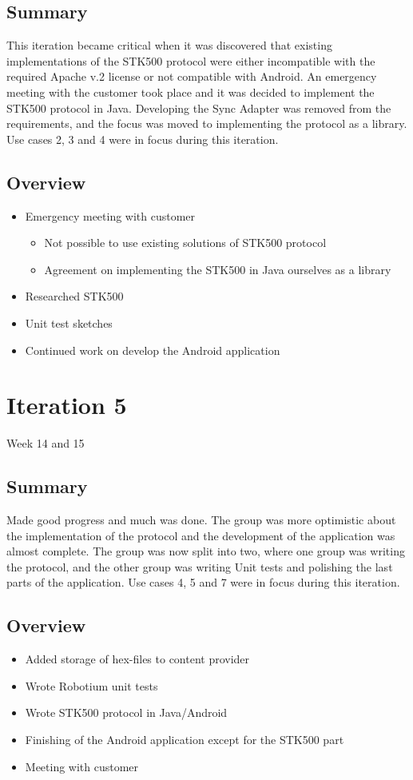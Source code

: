 \subsection{Summary}
	This iteration became critical when it was discovered that existing implementations of the STK500 protocol were either incompatible with the required Apache v.2 license or not compatible with Android. An emergency meeting with the customer took place and it was decided to implement the STK500 protocol in Java. Developing the Sync Adapter was removed from the requirements, and the focus was moved to implementing the protocol as a library. Use cases 2, 3 and 4 were in focus during this iteration.

\subsection{Overview}
\begin{itemize}
	\item{Emergency meeting with customer}
	\begin{itemize}
		\item{Not possible to use existing solutions of STK500 protocol}
		\item{Agreement on implementing the STK500 in Java ourselves as a library}
	\end{itemize}
	\item{Researched STK500}
	\item{Unit test sketches}
	\item{Continued work on develop the Android application}
\end{itemize}

\section{Iteration 5}
Week 14 and 15
\subsection{Summary}
	Made good progress and much was done. The group was more optimistic about the implementation of the protocol and the development of the application was almost complete.	The group was now split into two, where one group was writing the protocol, and the other group was writing Unit tests and polishing the last parts of the application. Use cases 4, 5 and 7 were in focus during this iteration.

\subsection{Overview}
\begin{itemize}
	\item{Added storage of hex-files to content provider}
	\item{Wrote Robotium unit tests}
	\item{Wrote STK500 protocol in Java/Android}
	\item{Finishing of the Android application except for the STK500 part}
	\item{Meeting with customer}
\end{itemize}

